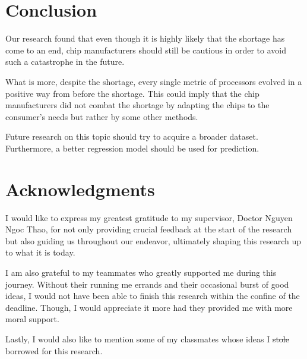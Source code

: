 \documentclass[conference]{IEEEtran}
\begin{document}
\section{Conclusion}
Our research found that even though it is highly likely that the shortage has
come to an end, chip manufacturers should still be cautious in order to avoid
such a catastrophe in the future.

What is more, despite the shortage, every single metric of processors evolved
in a positive way from before the shortage.
This could imply that the chip manufacturers did not combat the shortage by
adapting the chips to the consumer’s needs but rather by some other methods.

Future research on this topic should try to acquire a broader dataset.
Furthermore, a better regression model should be used for prediction.

\section{Acknowledgments}
I would like to express my greatest gratitude to my supervisor,
Doctor Nguyen Ngoc Thao, for not only providing crucial feedback at the start
of the research but also guiding us throughout our endeavor, ultimately shaping
this research up to what it is today.

I am also grateful to my teammates who greatly supported me during
this journey. Without their running me errands and their occasional burst of
good ideas, I would not have been able to finish this research within the
confine of the deadline. Though, I would appreciate it more had they
provided me with more moral support.

Lastly, I would also like to mention some of my classmates whose ideas I
\sout{stole} borrowed for this research.



\end{document}
